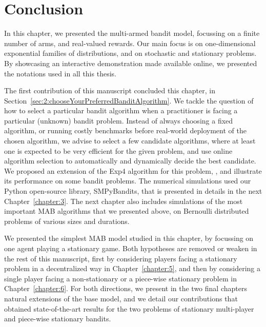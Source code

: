 \newpage  %

\section{Conclusion}
\label{sec:2:conclusion}

In this chapter, we presented the multi-armed bandit model, focussing on a finite number of arms, and real-valued rewards.
Our main focus is on one-dimensional exponential families of distributions, and on stochastic and stationary problems.
By showcasing an interactive demonstration made available online,
we presented the notations used in all this thesis.

The first contribution of this manuscript \cite{Besson2018WCNC} concluded this chapter, in Section~\ref{sec:2:chooseYourPreferredBanditAlgorithm}. We tackle the question of how to select a particular bandit algorithm when a practitioner is facing a particular (unknown) bandit problem.
Instead of always choosing a fixed algorithm, or running costly benchmarks before real-world deployment of the chosen algorithm, we advise to select a few candidate algorithms, where at least one is expected to be very efficient for the given problem, and use online algorithm selection to automatically and dynamically decide the best candidate.
We proposed an extension of the Exp4 algorithm for this problem, \Aggr, and illustrate its performance on some bandit problems.
%
The numerical simulations used our Python open-source library, SMPyBandits, that is presented in details in the next Chapter~\ref{chapter:3}.
The next chapter also includes simulations of the most important MAB algorithms that we presented above, on Bernoulli distributed problems of various sizes and durations.

We presented the simplest MAB model studied in this chapter, by focussing on one agent playing a stationary game.
Both hypotheses are removed or weaken in the rest of this manuscript,
first by considering players facing a stationary problem in a decentralized way in Chapter~\ref{chapter:5},
and then by considering a single player facing a non-stationary or a piece-wise stationary problem in Chapter~\ref{chapter:6}.
%
For both directions, we present in the two final chapters natural extensions of the base model, and we detail our contributions that obtained state-of-the-art results for the two problems
of stationary multi-player and piece-wise stationary bandits.

